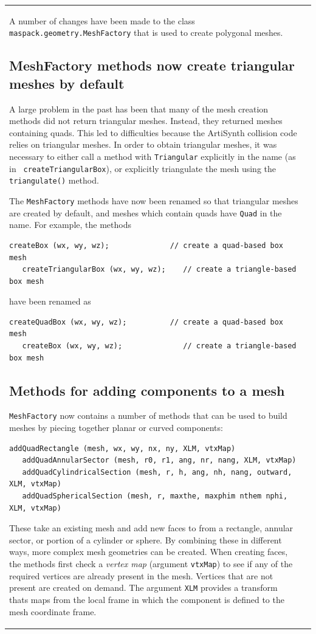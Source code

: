 \documentclass{article}
\begin{document}
\begin{tabular}{ll}
A number of changes have been made to the class {\tt
maspack.geometry.MeshFactory} that is used to create polygonal meshes.

\subsection*{MeshFactory methods now create triangular meshes by
default}

A large problem in the past has been that many of the mesh creation
methods did not return triangular meshes. Instead, they returned
meshes containing quads. This led to difficulties because the
ArtiSynth collision code relies on triangular meshes. In order to
obtain triangular meshes, it was necessary to either call a method
with {\tt Triangular} explicitly in the name (as in {\tt
createTriangularBox}), or explicitly triangulate the mesh using the
{\tt triangulate()} method.

The {\tt MeshFactory} methods have now been renamed so that triangular
meshes are created by default, and meshes which contain quads have
{\tt Quad} in the name. For example, the methods
\begin{lstlisting}[]
   createBox (wx, wy, wz);              // create a quad-based box mesh
   createTriangularBox (wx, wy, wz);    // create a triangle-based box mesh
\end{lstlisting}
have been renamed as
\begin{lstlisting}[]
   createQuadBox (wx, wy, wz);          // create a quad-based box mesh
   createBox (wx, wy, wz);              // create a triangle-based box mesh
\end{lstlisting}

\subsection*{Methods for adding components to a mesh}

{\tt MeshFactory} now contains a number of methods that can be used to
build meshes by piecing together planar or curved components:
\begin{lstlisting}[]
   addQuadRectangle (mesh, wx, wy, nx, ny, XLM, vtxMap)
   addQuadAnnularSector (mesh, r0, r1, ang, nr, nang, XLM, vtxMap)
   addQuadCylindricalSection (mesh, r, h, ang, nh, nang, outward, XLM, vtxMap)
   addQuadSphericalSection (mesh, r, maxthe, maxphim nthem nphi, XLM, vtxMap)
\end{lstlisting}
These take an existing mesh and add new faces to from a rectangle,
annular sector, or portion of a cylinder or sphere. By combining these
in different ways, more complex mesh geometries can be created. When
creating faces, the methods first check a {\it vertex map} (argument
{\tt vtxMap}) to see if any of the required vertices are already
present in the mesh. Vertices that are not present are created on
demand.  The argument {\tt XLM} provides a transform thats maps from
the local frame in which the component is defined to the mesh
coordinate frame.


\end{tabular}
\end{document}
